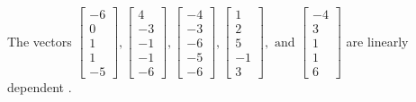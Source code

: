 \begin{exercise}
\begin{exerciseStatement}
  \end{exerciseStatement}
  \begin{exerciseAnswer}
   The vectors \(\left[\begin{array}{r}
-6 \\
0 \\
1 \\
1 \\
-5
\end{array}\right] , \left[\begin{array}{r}
4 \\
-3 \\
-1 \\
-1 \\
-6
\end{array}\right] , \left[\begin{array}{r}
-4 \\
-3 \\
-6 \\
-5 \\
-6
\end{array}\right] , \left[\begin{array}{r}
1 \\
2 \\
5 \\
-1 \\
3
\end{array}\right] , \text{ and } \left[\begin{array}{r}
-4 \\
3 \\
1 \\
1 \\
6
\end{array}\right]\) are 
  	 linearly dependent  .
  


  \end{exerciseAnswer}
\end{exercise}
